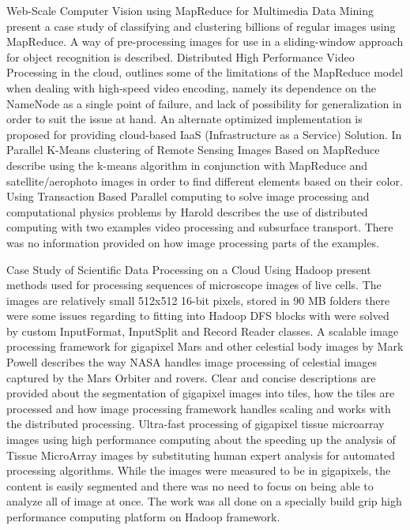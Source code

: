 \documentclass[conference]{IEEEtran}
\begin{document}
	Web-Scale Computer Vision using MapReduce for Multimedia Data Mining \cite{White2010} present a case study of classifying and clustering billions of regular images using MapReduce. A way of pre-processing images for use in a sliding-window approach for object recognition is described. Distributed High Performance Video Processing in the cloud, outlines some of the limitations of the MapReduce model when dealing with high-speed video encoding, namely its dependence on the NameNode as a single point of failure, and lack of possibility for generalization in order to suit the issue at hand. An alternate optimized implementation is proposed for providing cloud-based IaaS (Infrastructure as a Service) Solution. In Parallel K-Means clustering of Remote Sensing Images Based on MapReduce \cite{Lv2010} describe using the k-means algorithm in conjunction with MapReduce and satellite/aerophoto images in order to find different elements based on their color. Using Transaction Based Parallel computing to solve image processing and computational physics problems by Harold describes the use of distributed computing with two examples video processing and subsurface transport. There was no information provided on how image processing parts of the examples. 
	
	Case Study of Scientific Data Processing on a Cloud Using Hadoop \cite{Zhang2010} present methods used for processing sequences of microscope images of live cells. The images are relatively small 512x512 16-bit pixels, stored in 90 MB folders there were some issues regarding to fitting into Hadoop DFS blocks with were solved by custom InputFormat, InputSplit and Record Reader classes. A scalable image processing framework for gigapixel Mars and other celestial body images by Mark Powell describes the way NASA handles image processing of celestial images captured by the Mars Orbiter and rovers. Clear and concise descriptions are provided about the segmentation of gigapixel images into tiles, how the tiles are processed and how image processing framework handles scaling and works with the distributed processing. Ultra-fast processing of gigapixel tissue microarray images using high performance computing \cite{Wang2011} about the speeding up the analysis of Tissue MicroArray images by substituting human expert analysis for automated processing algorithms. While the images were measured to be in gigapixels, the content is easily segmented and there was no need to focus on being able to analyze all of image at once. The work was all done on a specially build grip high performance	computing platform on Hadoop framework. 
	
\end{document}
